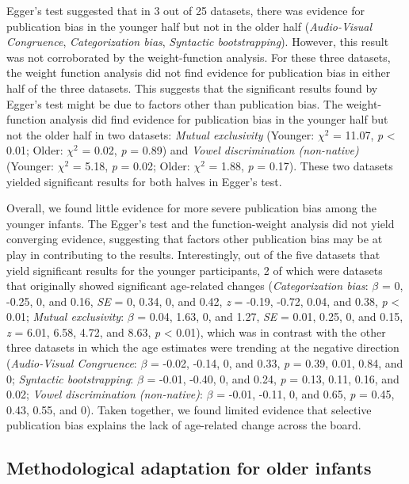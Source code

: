 \documentclass[
  man]{apa6}
\begin{document}
Egger's test suggested that in 3 out of 25 datasets, there was evidence for publication bias in the younger half but not in the older half (\emph{Audio-Visual Congruence}, \emph{Categorization bias}, \emph{Syntactic bootstrapping}). However, this result was not corroborated by the weight-function analysis. For these three datasets, the weight function analysis did not find evidence for publication bias in either half of the three datasets. This suggests that the significant results found by Egger's test might be due to factors other than publication bias. The weight-function analysis did find evidence for publication bias in the younger half but not the older half in two datasets: \emph{Mutual exclusivity} (Younger: \(\chi^2\) = 11.07, \emph{p} \textless{} 0.01; Older: \(\chi^2\) = 0.02, \emph{p} = 0.89) and \emph{Vowel discrimination (non-native)} (Younger: \(\chi^2\) = 5.18, \emph{p} = 0.02; Older: \(\chi^2\) = 1.88, \emph{p} = 0.17). These two datasets yielded significant results for both halves in Egger's test.

Overall, we found little evidence for more severe publication bias among the younger infants. The Egger's test and the function-weight analysis did not yield converging evidence, suggesting that factors other publication bias may be at play in contributing to the results. Interestingly, out of the five datasets that yield significant results for the younger participants, 2 of which were datasets that originally showed significant age-related changes (\emph{Categorization bias}: \(\beta\) = 0, -0.25, 0, and 0.16, \emph{SE} = 0, 0.34, 0, and 0.42, \emph{z} = -0.19, -0.72, 0.04, and 0.38, \emph{p} \textless{} 0.01; \emph{Mutual exclusivity}: \(\beta\) = 0.04, 1.63, 0, and 1.27, \emph{SE} = 0.01, 0.25, 0, and 0.15, \emph{z} = 6.01, 6.58, 4.72, and 8.63, \emph{p} \textless{} 0.01), which was in contrast with the other three datasets in which the age estimates were trending at the negative direction (\emph{Audio-Visual Congruence}: \(\beta\) = -0.02, -0.14, 0, and 0.33, \emph{p} = 0.39, 0.01, 0.84, and 0; \emph{Syntactic bootstrapping}: \(\beta\) = -0.01, -0.40, 0, and 0.24, \emph{p} = 0.13, 0.11, 0.16, and 0.02; \emph{Vowel discrimination (non-native)}: \(\beta\) = -0.01, -0.11, 0, and 0.65, \emph{p} = 0.45, 0.43, 0.55, and 0). Taken together, we found limited evidence that selective publication bias explains the lack of age-related change across the board.

\hypertarget{methodological-adaptation-for-older-infants}{%
\subsection{Methodological adaptation for older infants}\label{methodological-adaptation-for-older-infants}}
\end{document}
